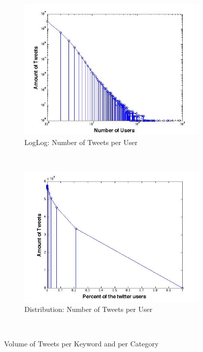 \begin{figure}[H]
\begin{subfigure}[b]{0.5\textwidth}
                \includegraphics[width=\textwidth]{img/anal/loglog_users_tweets}
                \caption{LogLog: Number of Tweets per User}
                \label{fig:u_log}
        \end{subfigure}
        ~ %
      \begin{subfigure}[b]{0.5\textwidth}
                \includegraphics[width=\textwidth]{img/anal/no_power}
                \caption{Distribution: Number of Tweets per User}
                \label{fig:no_power}
        \end{subfigure}
        ~ %

      
        \caption{Volume of Tweets per Keyword and per Category}\label{fig:distribution}
\end{figure}



